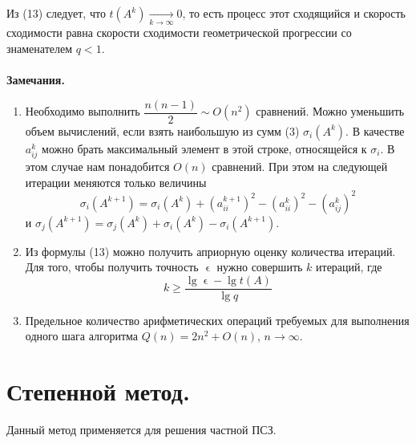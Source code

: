 \documentclass[a4paper, 12pt]{report}
\renewcommand{\geq}{\geqslant}
\renewcommand{\epsilon}{\upvarepsilon}
\begin{document}
	Из (13) следует, что $t(A^k)\xrightarrow[k\to \infty]{}0$, то есть процесс этот сходящийся и скорость сходимости равна скорости сходимости геометрической прогрессии со знаменателем $q<1$. \\\\
	\textbf{Замечания.}\begin{enumerate}
		\item Необходимо выполнить $\dfrac{n(n-1)}{2}\sim O(n^2)$ сравнений. Можно уменьшить объем вычислений, если взять наибольшую из сумм (3) $\sigma_i(A^k)$. В качестве $a_{ij}^k$ можно брать максимальный элемент в этой строке, относящейся к $\sigma_i$. В этом случае нам понадобится $O(n)$ сравнений. При этом на следующей итерации меняются только величины $$\sigma_i(A^{k+1})=\sigma_i(A^k) + (a_{ii}^{k+1})^2 - (a_{ii}^k)^2 - (a_{ij}^k)^2$$ и $\sigma_j(A^{k+1}) = \sigma_j(A^k) +\sigma_i(A^k) - \sigma_i(A^{k+1}).$
		\item Из формулы (13) можно получить априорную оценку количества итераций. Для того, чтобы получить точность $\epsilon$ нужно совершить $k$ итераций, где $$k \geq \dfrac{\lg\epsilon - \lg t(A)}{\lg q}$$
		\item Предельное количество арифметических операций требуемых для выполнения одного шага алгоритма $Q(n) = 2n^2 + O(n)$, $n\to\infty$.
	\end{enumerate}
	\section{Степенной метод.}
	Данный метод применяется для решения частной ПСЗ.
\end{document}
